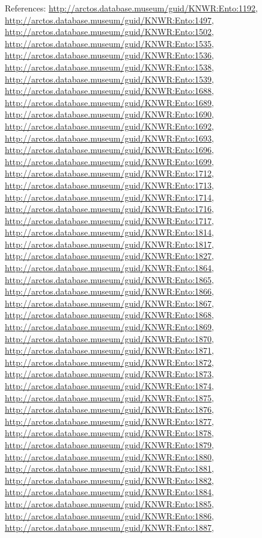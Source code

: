 \documentclass[9pt, article]{memoir}
\begin{document}
\begin{multicols}{2}
References: 
\url{http://arctos.database.museum/guid/KNWR:Ento:1192}, 
\url{http://arctos.database.museum/guid/KNWR:Ento:1497}, 
\url{http://arctos.database.museum/guid/KNWR:Ento:1502}, 
\url{http://arctos.database.museum/guid/KNWR:Ento:1535}, 
\url{http://arctos.database.museum/guid/KNWR:Ento:1536}, 
\url{http://arctos.database.museum/guid/KNWR:Ento:1538}, 
\url{http://arctos.database.museum/guid/KNWR:Ento:1539}, 
\url{http://arctos.database.museum/guid/KNWR:Ento:1688}, 
\url{http://arctos.database.museum/guid/KNWR:Ento:1689}, 
\url{http://arctos.database.museum/guid/KNWR:Ento:1690}, 
\url{http://arctos.database.museum/guid/KNWR:Ento:1692}, 
\url{http://arctos.database.museum/guid/KNWR:Ento:1693}, 
\url{http://arctos.database.museum/guid/KNWR:Ento:1696}, 
\url{http://arctos.database.museum/guid/KNWR:Ento:1699}, 
\url{http://arctos.database.museum/guid/KNWR:Ento:1712}, 
\url{http://arctos.database.museum/guid/KNWR:Ento:1713}, 
\url{http://arctos.database.museum/guid/KNWR:Ento:1714}, 
\url{http://arctos.database.museum/guid/KNWR:Ento:1716}, 
\url{http://arctos.database.museum/guid/KNWR:Ento:1717}, 
\url{http://arctos.database.museum/guid/KNWR:Ento:1814}, 
\url{http://arctos.database.museum/guid/KNWR:Ento:1817}, 
\url{http://arctos.database.museum/guid/KNWR:Ento:1827}, 
\url{http://arctos.database.museum/guid/KNWR:Ento:1864}, 
\url{http://arctos.database.museum/guid/KNWR:Ento:1865}, 
\url{http://arctos.database.museum/guid/KNWR:Ento:1866}, 
\url{http://arctos.database.museum/guid/KNWR:Ento:1867}, 
\url{http://arctos.database.museum/guid/KNWR:Ento:1868}, 
\url{http://arctos.database.museum/guid/KNWR:Ento:1869}, 
\url{http://arctos.database.museum/guid/KNWR:Ento:1870}, 
\url{http://arctos.database.museum/guid/KNWR:Ento:1871}, 
\url{http://arctos.database.museum/guid/KNWR:Ento:1872}, 
\url{http://arctos.database.museum/guid/KNWR:Ento:1873}, 
\url{http://arctos.database.museum/guid/KNWR:Ento:1874}, 
\url{http://arctos.database.museum/guid/KNWR:Ento:1875}, 
\url{http://arctos.database.museum/guid/KNWR:Ento:1876}, 
\url{http://arctos.database.museum/guid/KNWR:Ento:1877}, 
\url{http://arctos.database.museum/guid/KNWR:Ento:1878}, 
\url{http://arctos.database.museum/guid/KNWR:Ento:1879}, 
\url{http://arctos.database.museum/guid/KNWR:Ento:1880}, 
\url{http://arctos.database.museum/guid/KNWR:Ento:1881}, 
\url{http://arctos.database.museum/guid/KNWR:Ento:1882}, 
\url{http://arctos.database.museum/guid/KNWR:Ento:1884}, 
\url{http://arctos.database.museum/guid/KNWR:Ento:1885}, 
\url{http://arctos.database.museum/guid/KNWR:Ento:1886}, 
\url{http://arctos.database.museum/guid/KNWR:Ento:1887}, 

\end{multicols}
\end{document}
